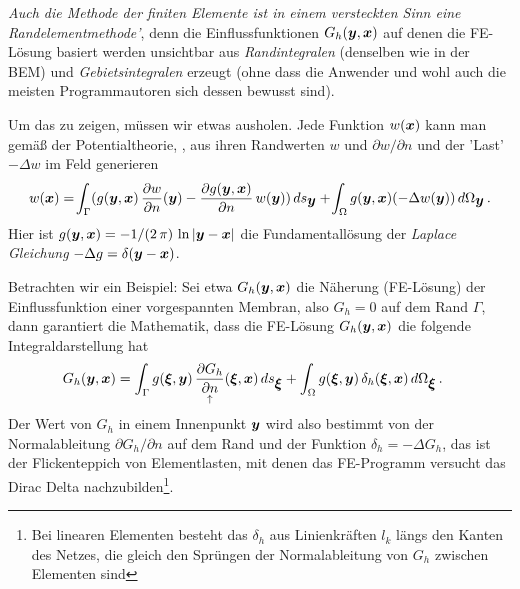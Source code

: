 {\small
{\em Auch die Methode der finiten Elemente ist in einem versteckten Sinn eine \glq Randelementmethode'\/}, denn die Einflussfunktionen $G_h(\mbox{\boldmath $y$},\mbox{\boldmath $x$})$ auf denen die FE-L\"{o}sung basiert werden unsichtbar aus {\em Randintegralen\/} (denselben wie in der BEM) und {\em Gebietsintegralen\/} erzeugt (ohne dass die Anwender und wohl auch die meisten Programmautoren sich dessen bewusst sind).

Um das zu zeigen, m\"{u}ssen wir etwas ausholen. Jede Funktion $w(\mbox{\boldmath $x$})$ kann man gem\"{a}{\ss} der Potentialtheorie, \cite{Ha3}, aus ihren Randwerten $w$ und $\partial w/\partial n$ und der 'Last' $-\Delta w$ im Feld generieren
\begin{align} \label{Eq20}
w(\mbox{\boldmath $x$}) = \! \int_{\Gamma} (g(\mbox{\boldmath $y$}, \mbox{\boldmath $x$})\,\frac{\partial w}{\partial n}(\mbox{\boldmath $y$}) - \frac{\partial g(\mbox{\boldmath $y$}, \mbox{\boldmath $x$})}{\partial n}\,w(\mbox{\boldmath $y$}))\,ds_{\mbox{\boldmath $y$}} +  \!\int_{\Omega}g(\mbox{\boldmath $y$},\mbox{\boldmath $x$}) (- \Delta w(\mbox{\boldmath $y$}))\,d\Omega_{\mbox{\boldmath $y$}}\,.
\end{align}
Hier ist $g(\mbox{\boldmath $y$}, \mbox{\boldmath $x$}) = - 1/(2\,\pi)\,\ln |\mbox{\boldmath $y$} - \mbox{\boldmath $x$}|$ die Fundamentall\"{o}sung der {\em Laplace Gleichung\/} $- \Delta g = \delta(\mbox{\boldmath $y$} - \mbox{\boldmath $x$})$.

Betrachten wir ein Beispiel: Sei etwa $G_h(\mbox{\boldmath $y$}, \mbox{\boldmath $x$})$ die N\"{a}herung (FE-L\"{o}sung) der Einflussfunktion einer vorgespannten Membran, also $G_h = 0$ auf dem Rand $\Gamma$, dann garantiert die Mathematik, dass die FE-L\"{o}sung $G_h(\mbox{\boldmath $y$}, \mbox{\boldmath $x$})$ die folgende Integraldarstellung hat
\begin{align}\label{Eq21}
G_h(\mbox{\boldmath $y$},\mbox{\boldmath $x$}) &=  \int_{\Gamma} g(\mbox{\boldmath $\xi$},\mbox{\boldmath $y$})\,\underset{\uparrow}{\frac{\partial G_h}{\partial n}}(\mbox{\boldmath $\xi$}, \mbox{\boldmath $x$})\,ds_{\mbox{\boldmath $\xi$}} + \int_{\Omega}g(\mbox{\boldmath $\xi$},\mbox{\boldmath $y$}) \,\delta_h(\mbox{\boldmath $\xi$},\mbox{\boldmath $x$})\,d\Omega_{\mbox{\boldmath $\xi$}}\,.
\end{align}
Der Wert von $G_h$ in einem Innenpunkt $\mbox{\boldmath $y$}$ wird also bestimmt von der Normalableitung $\partial G_h/\partial n $ auf dem Rand und der Funktion $\delta_h = - \Delta G_h$, das ist  der Flickenteppich von Elementlasten, mit denen das FE-Programm versucht das Dirac Delta nachzubilden\footnote{Bei linearen Elementen besteht das $\delta_h$ aus Linienkr\"{a}ften $l_k$ l\"{a}ngs den Kanten des Netzes, die gleich den Spr\"{u}ngen der Normalableitung von $G_h$ zwischen Elementen sind}.

}
